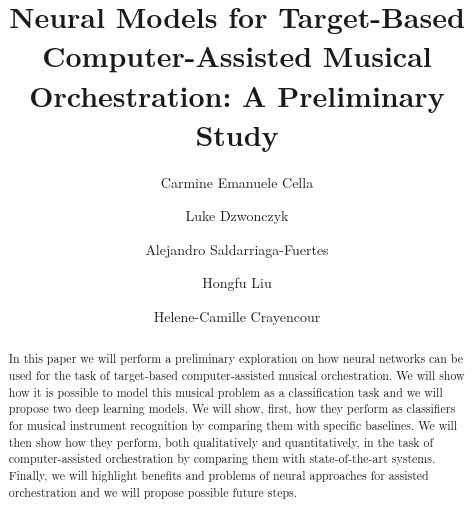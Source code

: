 \documentclass[runningheads,a4paper]{llncs}
\begin{document}
\mainmatter  %

\title{Neural Models for Target-Based Computer-Assisted Musical Orchestration: A Preliminary Study}


%
%
\author{Carmine Emanuele Cella\and Luke Dzwonczyk\and Alejandro Saldarriaga-Fuertes\and Hongfu Liu\and Helene-Camille Crayencour}
%


%
%

\maketitle

\begin{abstract}
In this paper we will perform a preliminary exploration on how neural networks can be used for the task of target-based computer-assisted musical orchestration. We will show how it is possible to model this  musical problem as a classification task and we will propose two deep learning models. We will show, first, how they perform as classifiers for musical instrument recognition by comparing them with specific baselines. We will then show how they perform, both qualitatively and quantitatively, in the task of computer-assisted orchestration by comparing them with state-of-the-art systems. Finally, we will highlight benefits and problems of neural approaches for assisted orchestration and we will propose possible future steps.
\end{abstract}
%
\end{document}
